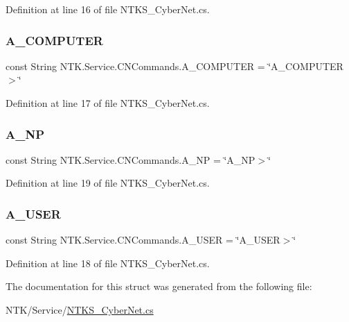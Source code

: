 Definition at line 16 of file N\+T\+K\+S\+\_\+\+Cyber\+Net.\+cs.

\mbox{\label{struct_n_t_k_1_1_service_1_1_c_n_commands_a9b1d2c79059416db6172a865b96c42ea}} 
\subsubsection{\texorpdfstring{A\_COMPUTER}{A\_COMPUTER}}
{\footnotesize\ttfamily const String N\+T\+K.\+Service.\+C\+N\+Commands.\+A\+\_\+\+C\+O\+M\+P\+U\+T\+ER = \char`\"{}A\+\_\+\+C\+O\+M\+P\+U\+T\+ER$>$\char`\"{}}



Definition at line 17 of file N\+T\+K\+S\+\_\+\+Cyber\+Net.\+cs.

\mbox{\label{struct_n_t_k_1_1_service_1_1_c_n_commands_ab5cd6f36b2374847020b22ef74e5fa22}} 
\subsubsection{\texorpdfstring{A\_NP}{A\_NP}}
{\footnotesize\ttfamily const String N\+T\+K.\+Service.\+C\+N\+Commands.\+A\+\_\+\+NP = \char`\"{}A\+\_\+\+NP$>$\char`\"{}}



Definition at line 19 of file N\+T\+K\+S\+\_\+\+Cyber\+Net.\+cs.

\mbox{\label{struct_n_t_k_1_1_service_1_1_c_n_commands_a8f222e6e2c51d7e7f3d76ce179389f5d}} 
\subsubsection{\texorpdfstring{A\_USER}{A\_USER}}
{\footnotesize\ttfamily const String N\+T\+K.\+Service.\+C\+N\+Commands.\+A\+\_\+\+U\+S\+ER = \char`\"{}A\+\_\+\+U\+S\+ER$>$\char`\"{}}



Definition at line 18 of file N\+T\+K\+S\+\_\+\+Cyber\+Net.\+cs.



The documentation for this struct was generated from the following file\+:\begin{DoxyCompactItemize}
\item 
N\+T\+K/\+Service/\mbox{\hyperlink{_n_t_k_s___cyber_net_8cs}{N\+T\+K\+S\+\_\+\+Cyber\+Net.\+cs}}\end{DoxyCompactItemize}
